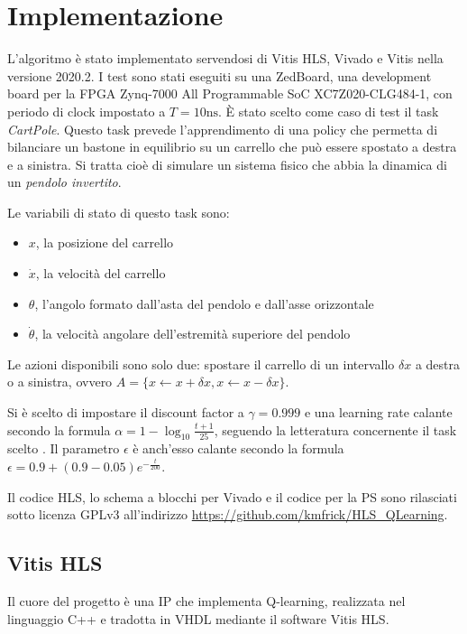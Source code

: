 \documentclass{article}
\begin{document}
\section{Implementazione}
L'algoritmo è stato implementato servendosi di Vitis HLS, Vivado e Vitis nella versione 2020.2. 
I test sono stati eseguiti su una ZedBoard, una development board per la FPGA Zynq-7000 All Programmable SoC XC7Z020-CLG484-1, con periodo di clock impostato a $T = 10 \textrm{ns}$.
È stato scelto come caso di test il task \emph{CartPole}.
Questo task prevede l'apprendimento di una policy che permetta di bilanciare un bastone in equilibrio su un carrello che può essere spostato a destra e a sinistra.
Si tratta cioè di simulare un sistema fisico che abbia la dinamica di un \emph{pendolo invertito}. 

Le variabili di stato di questo task sono:

\begin{itemize}
\item $x$, la posizione del carrello
\item $\dot{x}$, la velocità del carrello
\item $\theta$, l'angolo formato dall'asta del pendolo e dall'asse orizzontale
\item $\dot{\theta}$, la velocità angolare dell'estremità superiore del pendolo
\end{itemize}

Le azioni disponibili sono solo due: spostare il carrello di un intervallo $\delta x$ a destra o a sinistra, ovvero $A = \{x \leftarrow x + \delta x, x \leftarrow x - \delta x\}$. 

Si è scelto di impostare il discount factor a $\gamma = 0.999$ e una learning rate calante secondo la formula $\alpha = 1 - \log_{10}\frac{t + 1}{25}$, seguendo la letteratura concernente il task scelto \citep{sutton_reinforcement_2018}.
Il parametro $\epsilon$ è anch'esso calante secondo la formula $\epsilon = 0.9 + (0.9 - 0.05) e^{-\frac{t}{200}}$.

Il codice HLS, lo schema a blocchi per Vivado e il codice per la PS sono rilasciati sotto licenza GPLv3 all'indirizzo \url{https://github.com/kmfrick/HLS_QLearning}.
\subsection{Vitis HLS}
Il cuore del progetto è una IP che implementa Q-learning, realizzata nel linguaggio C++ e tradotta in VHDL mediante il software Vitis HLS. 
\end{document}
